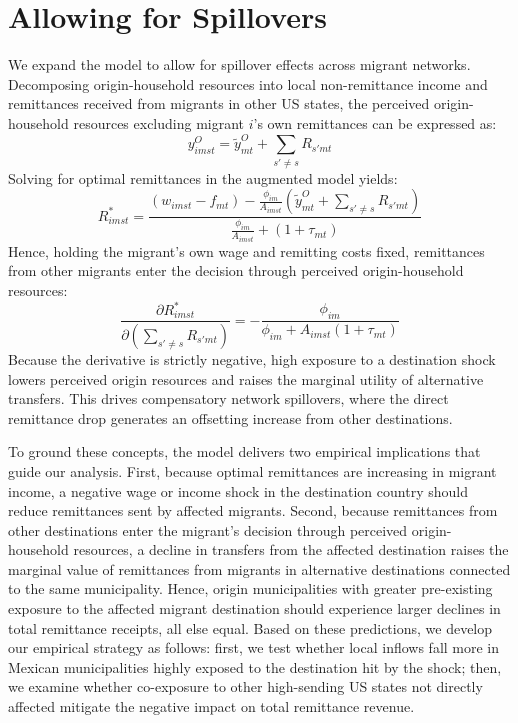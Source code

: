 \section{Allowing for Spillovers}

We expand the model to allow for spillover effects across migrant networks. Decomposing origin-household resources into local non-remittance income and remittances received from migrants in other US states, the perceived origin-household resources excluding migrant $i$'s own remittances can be expressed as:
\begin{equation}
    y^O_{imst} = \tilde{y}^O_{mt} + \sum_{s' \neq s} R_{s'mt}
\end{equation}
Solving for optimal remittances in the augmented model yields:
\begin{equation}
R_{imst}^* = \frac{(w_{imst} - f_{mt}) - \frac{\phi_{im}}{A_{imst}} \left(\tilde{y}^O_{mt} + \sum_{s' \neq s} R_{s'mt} \right)}{\frac{\phi_{im}}{A_{imst}} + (1 + \tau_{mt})}
\end{equation}
Hence, holding the migrant's own wage and remitting costs fixed, remittances from other migrants enter the decision through perceived origin-household resources:
\begin{equation}
\frac{\partial R_{imst}^*}{\partial \left( \sum_{s' \neq s} R_{s'mt} \right)} = - \frac{\phi_{im}}{\phi_{im} + A_{imst}(1 + \tau_{mt})}
\end{equation}
Because the derivative is strictly negative, high exposure to a destination shock lowers perceived origin resources and raises the marginal utility of alternative transfers. This drives compensatory network spillovers, where the direct remittance drop generates an offsetting increase from other destinations.

\par
To ground these concepts, the model delivers two empirical implications that guide our analysis. First, because optimal remittances are increasing in migrant income, a negative wage or income shock in the destination country should reduce remittances sent by affected migrants. Second, because remittances from other destinations enter the migrant's decision through perceived origin-household resources, a decline in transfers from the affected destination raises the marginal value of remittances from migrants in alternative destinations connected to the same municipality. Hence, origin municipalities with greater pre-existing exposure to the affected migrant destination should experience larger declines in total remittance receipts, all else equal. Based on these predictions, we develop our empirical strategy as follows: first, we test whether local inflows fall more in Mexican municipalities highly exposed to the destination hit by the shock; then, we examine whether co-exposure to other high-sending US states not directly affected mitigate the negative impact on total remittance revenue.
